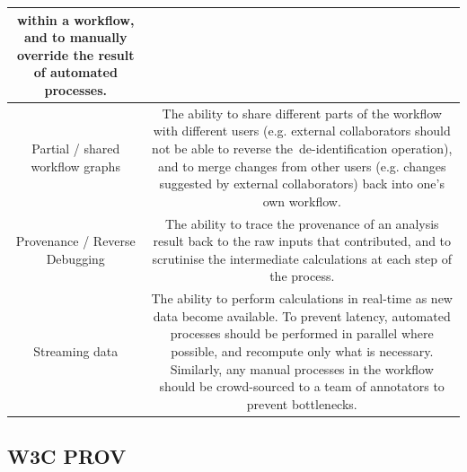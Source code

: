 \begin{longtable}[c]{cc}
\begin{minipage}[t]{0.47\columnwidth}
{within a workflow, and to manually override the result of automated
processes.}
\strut\end{minipage}\tabularnewline
\midrule
\begin{minipage}[t]{0.47\columnwidth}\raggedright\strut
{Partial / shared workflow graphs}
\strut\end{minipage} &
\begin{minipage}[t]{0.47\columnwidth}\raggedright\strut
{The ability to share different parts of the workflow with different
users (e.g. external collaborators should not }{be able to reverse
the}{~de-identification operation), and to merge changes from other
users (e.g. changes suggested by external collaborators) back into one's
own workflow.}
\strut\end{minipage}\tabularnewline
\midrule
\begin{minipage}[t]{0.47\columnwidth}\raggedright\strut
{Provenance / Reverse Debugging}
\strut\end{minipage} &
\begin{minipage}[t]{0.47\columnwidth}\raggedright\strut
{The ability to trace the provenance of an analysis result back to the
raw inputs that contributed, and to scrutinise the intermediate
calculations at each step of the process. }
\strut\end{minipage}\tabularnewline
\midrule
\begin{minipage}[t]{0.47\columnwidth}\raggedright\strut
{Streaming data}
\strut\end{minipage} &
\begin{minipage}[t]{0.47\columnwidth}\raggedright\strut
{The ability to perform calculations in real-time as new data become
available. To prevent latency, automated processes should be performed
in parallel where possible, and recompute only what is necessary.
Similarly, any manual processes in the workflow should be crowd-sourced
to a team of annotators to prevent bottlenecks.}
\strut\end{minipage}\tabularnewline
\bottomrule
\end{longtable}

\subsection{W3C PROV}
\label{sec:w3cprov}

